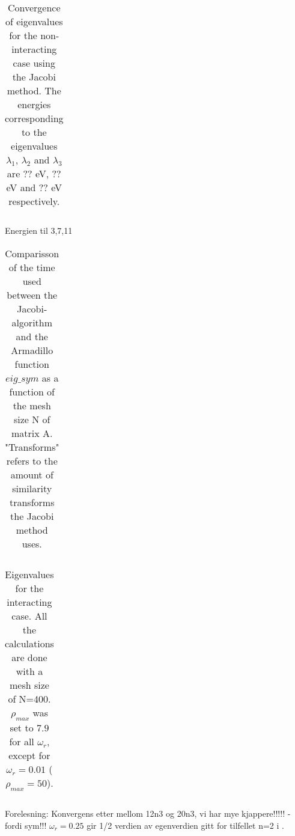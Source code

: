 
\begin{table}[H]\caption{Convergence of eigenvalues for the non-interacting case using the Jacobi method. The energies corresponding to the eigenvalues $\lambda_1$, $\lambda_2$ and $\lambda_3$ are ?? eV, ?? eV and ?? eV respectively.}
	\label{tab:eigval}
	\begin{tabular}{cccc}
		
	\end{tabular}
\end{table}

Energien til 3,7,11	


\begin{table}[H]\caption{Comparisson of the time used between the Jacobi-algorithm and the Armadillo function  $eig\_sym$ as a function of the mesh size N of matrix A. "Transforms" refers to the amount of similarity transforms the Jacobi method uses.}
	\label{tab:time}
	\begin{tabular}{cccccc}
		
	\end{tabular}
\end{table}




\begin{table}[H]\caption{Eigenvalues for the interacting case. All the calculations are done with a mesh size of N=400. $ \rho_{max} $ was set to $ 7.9 $ for all $ \omega_r $, except for $ \omega_r  = 0.01$ ( $ \rho_{max} =50$). }
	\label{tab:omega}
	\begin{tabular}{cccc}
		
	\end{tabular}
\end{table}

Forelesning: Konvergens etter mellom 12n3 og 20n3, vi har mye kjappere!!!!! - fordi sym!!!
$ \omega_r= 0.25 $ gir 1/2 verdien av egenverdien gitt for tilfellet n=2 i \cite{litterature}. 